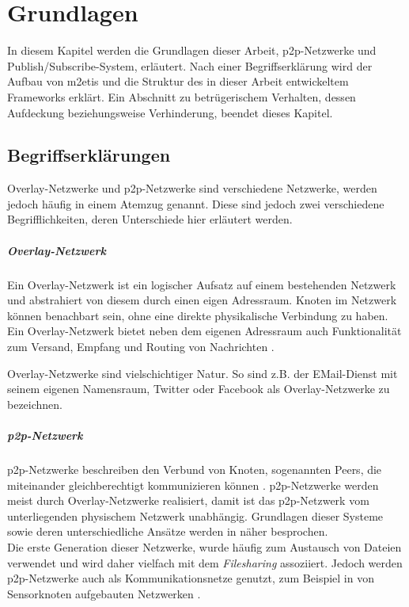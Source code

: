 \chapter{Grundlagen}
\label{chap:grundlagen}

In diesem Kapitel werden die Grundlagen dieser Arbeit, \ac{p2p}-Netzwerke und Publish/Subscribe-System, erläutert. Nach einer Begriffserklärung wird der Aufbau von \ac{m2etis} und die Struktur des in dieser Arbeit entwickeltem Frameworks erklärt. Ein Abschnitt zu betrügerischem Verhalten, dessen Aufdeckung beziehungsweise Verhinderung, beendet dieses Kapitel.

\section{Begriffserklärungen}

Overlay-Netzwerke und \ac{p2p}-Netzwerke sind verschiedene Netzwerke, werden jedoch häufig in einem Atemzug genannt. Diese sind jedoch zwei verschiedene Begrifflichkeiten, deren Unterschiede hier erläutert werden.

\paragraph{Overlay-Netzwerk} Ein Overlay-Netzwerk ist ein logischer Aufsatz auf einem bestehenden Netzwerk und abstrahiert von diesem durch einen eigen Adressraum. Knoten im Netzwerk können benachbart sein, ohne eine direkte physikalische Verbindung zu haben.\\
Ein Overlay-Netzwerk bietet neben dem eigenen Adressraum auch Funktionalität zum Versand, Empfang und Routing von Nachrichten \cite{Tannenbaum2003}.

Overlay-Netzwerke sind vielschichtiger Natur. So sind z.B. der EMail-Dienst mit seinem eigenen Namensraum, Twitter oder Facebook als Overlay-Netzwerke zu bezeichnen.

\paragraph{\ac{p2p}-Netzwerk} p2p-Netzwerke beschreiben den Verbund von Knoten, sogenannten Peers, die miteinander gleichberechtigt kommunizieren können \cite{Steinmetz2005}. p2p-Netzwerke werden meist durch Overlay-Netzwerke realisiert, damit ist das p2p-Netzwerk vom unterliegenden physischem Netzwerk unabhängig. Grundlagen dieser Systeme sowie deren unterschiedliche Ansätze werden in  näher besprochen.\\
Die erste Generation dieser Netzwerke, wurde häufig zum Austausch von Dateien verwendet und wird daher vielfach mit dem \emph{Filesharing} assoziiert. Jedoch werden p2p-Netzwerke auch als Kommunikationsnetze genutzt, zum Beispiel in von Sensorknoten aufgebauten Netzwerken \cite{MuneebAliandKoenLangendoen2007Case, Darlagiannis2006Peertopeer}.

